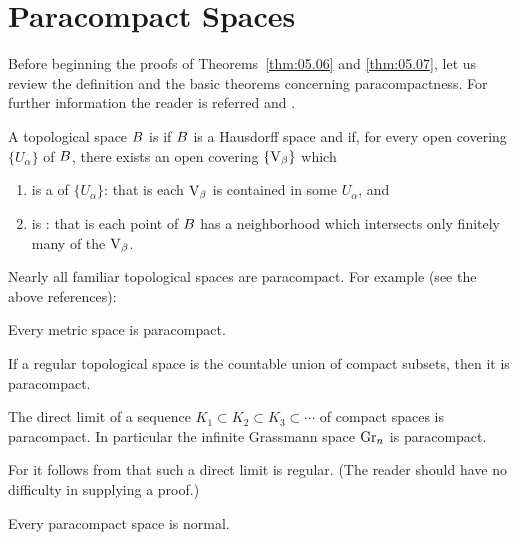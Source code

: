 \documentclass[../main]{subfiles}
\begin{document}
\section{Paracompact Spaces} \label{sec:5.3}
Before beginning the proofs of Theorems~\ref{thm:05.06} and \ref{thm:05.07}, let us review the definition and the basic theorems concerning paracompactness. For further information the reader is referred \cite{kelley1955} and \cite{dugundji1966}. 

\begin{definition}
A topological space $B$ is  if $B$ is a Hausdorff space and if, for every open covering $\{U_\alpha\}$ of $B$, there exists an open covering $\{\operatorname{V}_\beta\}$ which

\begin{enumerate}[label=\arabic*)]
    \item is a  of $\{U_\alpha\}$: that is each $\operatorname{V}_\beta$ is contained in some $U_\alpha$, and
    \item is : that is each point of $B$ has a neighborhood which intersects only finitely many of the $\operatorname{V}_\beta$. 
\end{enumerate}
\end{definition}

Nearly all familiar topological spaces are paracompact. For example (see the above references):
\begin{theorem*}[A. H. Stone]
Every metric space is paracompact.
\end{theorem*}
\begin{theorem*}[Morita]
If a regular topological space is the countable union of compact subsets, then it is paracompact.
\end{theorem*}

\begin{corollary*}
The direct limit of a sequence $K_1 \subset K_2 \subset K_3 \subset \cdots$ of compact spaces is paracompact. In particular the infinite Grassmann space $\operatorname{Gr}_n$ is paracompact. 
\end{corollary*}

For it follows from \cite[\S 18.4]{whitehead1961} that such a direct limit is regular. (The reader should have no difficulty in supplying a proof.)
\begin{theorem*}[Dieudonné]
Every paracompact space is normal.
\end{theorem*}
\end{document}
